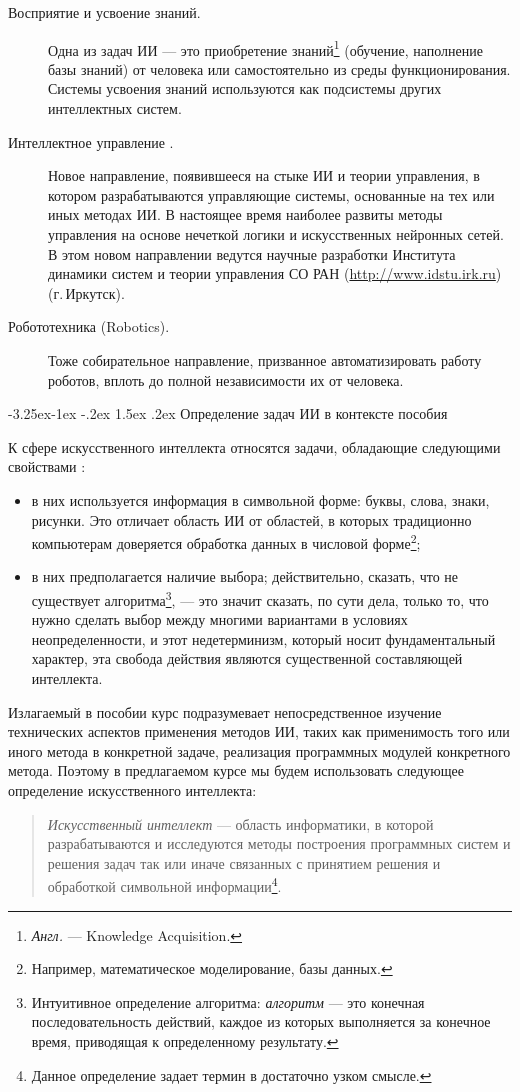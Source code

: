 \documentclass[12pt, openany, twoside]{book} %
\makeatletter
\renewcommand\subsection{\@startsection{subsection}{2}{\z@}%
                                     {-3.25ex\@plus -1ex \@minus -.2ex}%
                                     {1.5ex \@plus .2ex}%
                                     {\normalfont\normalsize\bfseries}}
\makeatother
\begin{document}
\begin{description}
 \item [Восприятие и усвоение знаний.] Одна из задач ИИ --- это приобретение знаний\footnote{\emph{Англ.} --- Knowledge Acquisition.} (обучение, наполнение базы знаний) от человека или самостоятельно из среды функционирования. Системы усвоения знаний используются как подсистемы других интеллектных систем.
 \item [Интеллектное управление \cite{Vass:2000}.] Новое направление, появившееся на стыке ИИ и теории управления, в котором разрабатываются управляющие системы, основанные на тех или иных методах ИИ. В настоящее время наиболее развиты методы управления на основе нечеткой логики и искусственных нейронных сетей. В этом новом направлении ведутся научные разработки Института динамики систем и теории управления СО РАН (\url{http://www.idstu.irk.ru}) (г.\,Иркутск).
\item [Робототехника (Robotics).] Тоже собирательное направление, призванное авто\-ма\-ти\-зировать работу роботов, вплоть до полной независимости их от человека.
\end{description}

\subsection{Определение задач ИИ в контексте пособия}

К сфере искусственного интеллекта относятся задачи, обладающие следующими свойствами \cite{Lauriere}:
 \begin{itemize}
 \item в них используется информация в символьной форме: буквы, слова, знаки, рисунки. Это отличает область ИИ от областей, в которых традиционно компьютерам доверяется обработка данных в числовой форме\footnote{Например, математическое моделирование, базы данных.};
  \item в них предполагается наличие выбора; действительно, сказать, что не существует алгоритма\footnote{Интуитивное определение алгоритма: \emph{алгоритм} --- это конечная последовательность действий, каждое из которых выполняется за конечное время, приводящая к определенному результату.}, --- это значит сказать, по сути дела, только то, что нужно сделать выбор между многими вариантами в условиях неопределенности, и этот недетерминизм, который носит фундаментальный характер, эта свобода действия являются существенной составляющей интеллекта.
 \end{itemize}

Излагаемый в пособии курс подразумевает непосредственное изучение технических аспектов применения методов ИИ, таких как применимость того или иного метода в конкретной задаче, реализация программных модулей конкретного метода. Поэтому в предлагаемом курсе мы будем использовать следующее определение искусственного интеллекта:
\begin{quote}{\em
Искусственный интеллект} --- область информатики, в которой разрабатываются и исследуются методы построения программных систем и решения задач так или иначе связанных с принятием решения и обработкой символьной информации\footnote{Данное определение задает термин в достаточно узком смысле.}.
\end{quote}
\end{document}
